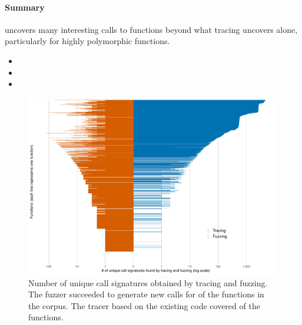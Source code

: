 \documentclass[sigplan,anonymous,review]{acmart}
\begin{document}
\paragraph{Summary}

\tool uncovers many interesting calls to functions beyond what tracing uncovers alone, particularly for highly polymorphic functions.



\begin{itemize}
    \item {} 
    \item {} 
    \item {} 
\end{itemize}






\begin{figure}
    \centering
    \includegraphics[width=\columnwidth]{code-and-figures/uf-call-signatures.pdf}
    \caption{Number of unique call signatures obtained by tracing and fuzzing. The fuzzer succeeded to generate new calls for \UFNumFunctionSignatrSignatureRatio of the functions in the corpus. The tracer based on the existing code covered \UFNumFunctionBaselineSignatureRatio of the functions.}
    \label{fig:call-signatures}
\end{figure}
\end{document}
